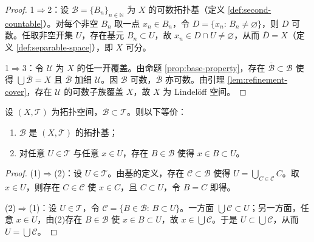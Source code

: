 \documentclass[lang=cn,a4paper,newtx,figureplace=section,tableplace=section]{elegantbook}
\begin{document}
\begin{proof}
1$\Rightarrow$2：设 $\mathcal{B}=\{B_n\}_{n\in\mathbb{N}}$ 为 $X$ 的可数拓扑基（定义 \ref{def:second-countable}）。对每个非空 $B_n$ 取一点 $x_n\in B_n$，令 $D=\{x_n:\,B_n\neq\varnothing\}$，则 $D$ 可数。任取非空开集 $U$，存在基元 $B_n\subset U$，故 $x_n\in D\cap U\neq\varnothing$，从而 $\overline{D}=X$（定义 \ref{def:separable-space}），即 $X$ 可分。

1$\Rightarrow$3：令 $\mathcal{U}$ 为 $X$ 的任一开覆盖。由命题 \ref{prop:base-property}，存在 $\overline{\mathcal{B}}\subset\mathcal{B}$ 使得 $\bigcup\overline{\mathcal{B}}=X$ 且 $\overline{\mathcal{B}}$ 加细 $\mathcal{U}$。因 $\mathcal{B}$ 可数，$\overline{\mathcal{B}}$ 亦可数。由引理 \ref{lem:refinement-cover}，存在 $\mathcal{U}$ 的可数子族覆盖 $X$，故 $X$ 为 Lindelöff 空间。
\end{proof}

\begin{proposition}[基的等价刻画]\label{prop:base-equivalence}
设 $(X,\mathcal T)$ 为拓扑空间，$\mathcal B\subset \mathcal T$。则以下等价：
\begin{enumerate}
  \item $\mathcal B$ 是 $(X,\mathcal T)$ 的拓扑基；
  \item 对任意 $U\in\mathcal T$ 与任意 $x\in U$，存在 $B\in\mathcal B$ 使得 $x\in B\subset U$。
\end{enumerate}
\end{proposition}
\begin{proof}
(1)$\Rightarrow$(2)：设 $U\in\mathcal T$。由基的定义，存在 $\mathcal C\subset \mathcal B$ 使得 $U=\bigcup_{C\in\mathcal C}C$。取 $x\in U$，则存在 $C\in\mathcal C$ 使 $x\in C$，且 $C\subset U$，令 $B=C$ 即得。

(2)$\Rightarrow$(1)：设 $U\in\mathcal T$，令 $\mathcal C=\{B\in\mathcal B:\,B\subset U\}$。一方面 $\bigcup\mathcal C\subset U$；另一方面，任意 $x\in U$，由(2)存在 $B\in\mathcal B$ 使 $x\in B\subset U$，故 $x\in\bigcup\mathcal C$。于是 $U\subset \bigcup\mathcal C$，从而 $U=\bigcup\mathcal C$。
\end{proof}
\end{document}
